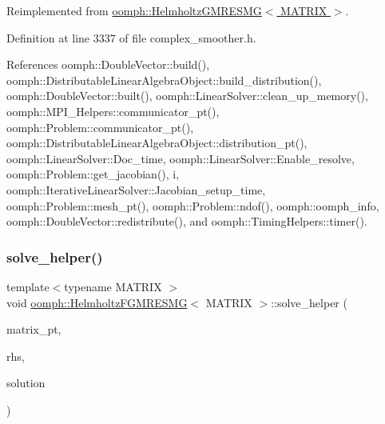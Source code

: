 Reimplemented from \hyperlink{classoomph_1_1HelmholtzGMRESMG_a5806236b991ac2d7fe4bc7a4f19e98fb}{oomph\+::\+Helmholtz\+G\+M\+R\+E\+S\+M\+G$<$ M\+A\+T\+R\+I\+X $>$}.



Definition at line 3337 of file complex\+\_\+smoother.\+h.



References oomph\+::\+Double\+Vector\+::build(), oomph\+::\+Distributable\+Linear\+Algebra\+Object\+::build\+\_\+distribution(), oomph\+::\+Double\+Vector\+::built(), oomph\+::\+Linear\+Solver\+::clean\+\_\+up\+\_\+memory(), oomph\+::\+M\+P\+I\+\_\+\+Helpers\+::communicator\+\_\+pt(), oomph\+::\+Problem\+::communicator\+\_\+pt(), oomph\+::\+Distributable\+Linear\+Algebra\+Object\+::distribution\+\_\+pt(), oomph\+::\+Linear\+Solver\+::\+Doc\+\_\+time, oomph\+::\+Linear\+Solver\+::\+Enable\+\_\+resolve, oomph\+::\+Problem\+::get\+\_\+jacobian(), i, oomph\+::\+Iterative\+Linear\+Solver\+::\+Jacobian\+\_\+setup\+\_\+time, oomph\+::\+Problem\+::mesh\+\_\+pt(), oomph\+::\+Problem\+::ndof(), oomph\+::oomph\+\_\+info, oomph\+::\+Double\+Vector\+::redistribute(), and oomph\+::\+Timing\+Helpers\+::timer().

\mbox{\label{classoomph_1_1HelmholtzFGMRESMG_a8bfd5045cf99bbeaf94b69ede3ccf0ad}} 
\subsubsection{\texorpdfstring{solve\+\_\+helper()}{solve\_helper()}}
{\footnotesize\ttfamily template$<$typename M\+A\+T\+R\+IX $>$ \\
void \hyperlink{classoomph_1_1HelmholtzFGMRESMG}{oomph\+::\+Helmholtz\+F\+G\+M\+R\+E\+S\+MG}$<$ M\+A\+T\+R\+IX $>$\+::solve\+\_\+helper (\begin{DoxyParamCaption}\item[{\hyperlink{classoomph_1_1DoubleMatrixBase}{Double\+Matrix\+Base} $\ast$const \&}]{matrix\+\_\+pt,  }\item[{const \hyperlink{classoomph_1_1DoubleVector}{Double\+Vector} \&}]{rhs,  }\item[{\hyperlink{classoomph_1_1DoubleVector}{Double\+Vector} \&}]{solution }\end{DoxyParamCaption})\hspace{0.3cm}{\ttfamily [private]}}



